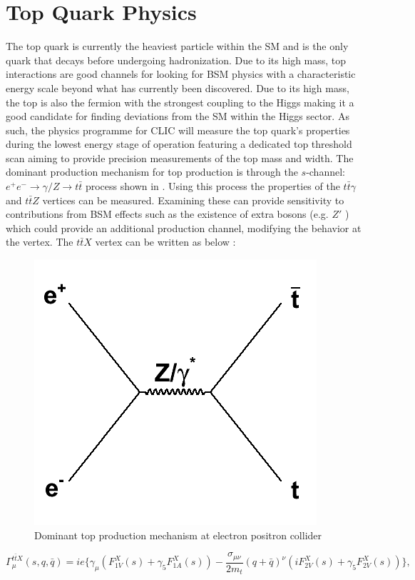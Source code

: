 \section{Top Quark Physics}


The top quark is currently the heaviest particle within the \ac{SM} and is the only quark that decays before undergoing hadronization. Due to its high mass, top interactions are good channels for looking for \ac{BSM} physics with a characteristic energy scale beyond what has currently been discovered. Due to its high mass, the top is also the fermion with the strongest coupling to the Higgs making it a good candidate for finding deviations from the \ac{SM} within the Higgs sector. As such, the physics programme for \ac{CLIC} will measure the top quark's properties during the lowest energy stage of operation featuring a dedicated top threshold scan aiming to provide precision measurements of the top mass and width. The dominant production mechanism for top production is through the $s$-channel: $e^+e^-\rightarrow\gamma /Z\rightarrow t\bar{t}$ process shown in . Using this process the properties of the $t\bar{t}\gamma$ and $t\bar{t}Z$ vertices can be measured. Examining these can provide sensitivity to contributions from \ac{BSM} effects such as the existence of extra bosons (e.g. $Z'$ \cite{Langacker:2008yv}) which could provide an additional production channel, modifying the behavior at the vertex. The  $t\bar{t}X$ vertex can be written as below \cite{Amjad:2015mma}:

\begin{figure}
\centering
\includegraphics[width=0.35\linewidth]{Theory/fig/ttFeynmann}
\caption[Dominant top production mechanism at electron positron colliders]{Dominant top production mechanism at electron positron collider}
\label{fig:topFeynmann}
\end{figure}

\begin{equation}
\Gamma_{\mu}^{t\bar{t}X}(s,q,\bar{q})= ie\{ \gamma_{\mu}(F_{1V}^{X}(s)+ \gamma_{5}F_{1A}^{X}(s)) - \frac{\sigma_{\mu\nu}}{2m_t}(q+\bar{q})^{\nu}(iF_{2V}^{X}(s) + \gamma_{5}F_{2V}^{X}(s))\},
\end{equation}


